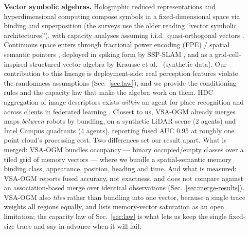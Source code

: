 \documentclass[conference]{IEEEtran}
\begin{document}
\textbf{Vector symbolic algebras.} Holographic reduced
representations \cite{plate1995holographic} and hyperdimensional
computing \cite{kanerva2009hyperdimensional,kleyko2022survey} compose
symbols in a fixed-dimensional space via binding and superposition
(the surveys use the older reading ``vector symbolic architectures''),
with capacity analyses assuming i.i.d.\ quasi-orthogonal vectors
\cite{frady2018theory}. Continuous space enters through fractional power
encoding (FPE) / spatial semantic pointers
\cite{komer2019neural,voelker2021simulating}, deployed in spiking form by
SSP-SLAM \cite{dumont2023sspslam}, and as a grid-cell-inspired structured
vector algebra by Krausse et al.\ \cite{krausse2025gcvsa} (synthetic
data). Our contribution to this
lineage is deployment-side: real perception features violate the
randomness assumptions (Sec.~\ref{sec:law}), and we provide the
conditioning rules and the capacity law that make the algebra work on
them. HDC aggregation of image descriptors exists \emph{within} an agent
for place recognition \cite{neubert2021hyperdimensional} and across
clients in federated learning \cite{fedhd2022}. Closest to us, VSA-OGM
\cite{snyder2026vsaogm} already merges maps \emph{between} robots by
bundling, on a synthetic LiDAR scene (2 agents) and Intel Campus
quadrants (4 agents), reporting fused AUC 0.95 at roughly one point
cloud's processing cost. Two differences set our result apart. What is
merged: VSA-OGM bundles occupancy --- binary occupied/empty classes over
a tiled grid of memory vectors --- where we bundle a spatial-semantic
memory binding class, appearance, position, heading and time. And what is
measured: VSA-OGM reports fused accuracy, not exactness, and does not
compare against an association-based merge over identical observations
(Sec.~\ref{sec:merge-results}). VSA-OGM also \emph{tiles} rather than
bundling into one vector, because a single trace weights all regions
equally, and lists memory-vector saturation as an open limitation; the
capacity law of Sec.~\ref{sec:law} is what lets us keep the single
fixed-size trace and say in advance when it will fail.
\end{document}
